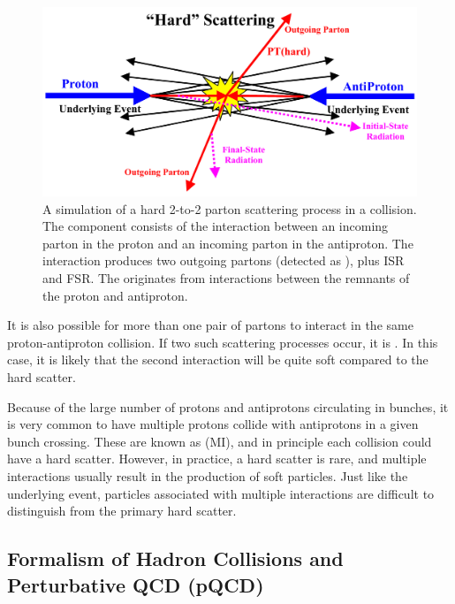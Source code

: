 \begin{figure}[htbm]
 \centering
 \includegraphics[scale=0.4,keepaspectratio=true]{./ppbar_collision.png}
 \caption{A simulation of a hard 2-to-2 parton scattering process in a \ppbar collision. The  component consists of the interaction between an incoming parton in the proton and an incoming parton in the antiproton. The interaction produces two outgoing partons (detected as ), plus ISR and FSR. The  originates from interactions between the remnants of the proton and antiproton.}
 \label{fig:ppbar_collision}
\end{figure}
\vspace{-0.01\textheight}

It is also possible for more than one pair of partons to interact in the same proton-antiproton collision. If two such scattering processes occur, it is . In this case, it is likely that the second interaction will be quite soft compared to the hard scatter.

Because of the large number of protons and antiprotons circulating in bunches, it is very common to have multiple protons collide with antiprotons in a given bunch crossing. These are known as  (MI), and in principle each collision could have a hard scatter. However, in practice, a hard scatter is rare, and multiple interactions usually result in the production of soft particles. Just like the underlying event, particles associated with multiple interactions are difficult to distinguish from the primary hard scatter.

\subsection{Formalism of Hadron Collisions and Perturbative QCD (pQCD)}
\label{sec:pQCD}

